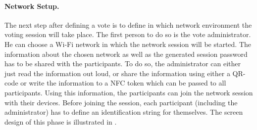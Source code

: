 \documentclass[numbers=noenddot, abstract=on, a4paper, headsepline,
footsepline, oneside, draft=off]{scrreprt}
\begin{document}
\paragraph{Network Setup.}
The next step after defining a vote is to define in which network environment
the voting session will take place. The first person to do so is the vote
administrator. He can choose a Wi-Fi network in which the network session will
be started. The information about the chosen network as well as the generated
session password has to be shared with the participants. To do so, the
administrator can either just read the information out loud, or share the
information using either a QR-code or write the information to a NFC token which
can be passed to all participants. Using this information, the participants can
join the network session with their devices. Before joining the session, each
participant (including the administrator) has to define an identification string
for themselves. The screen design of this phase is illustrated in
.
\end{document}
